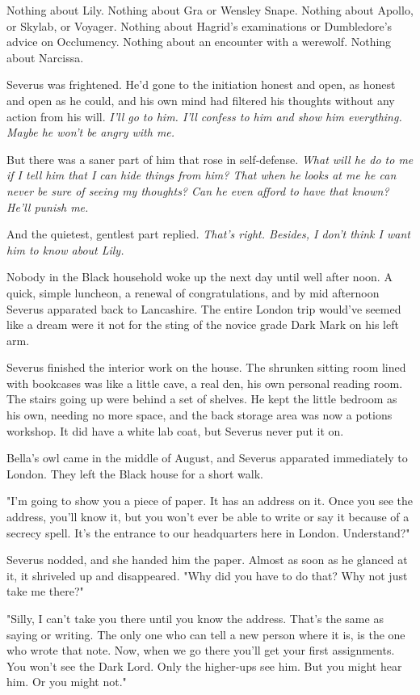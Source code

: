 \documentclass[a4paper,11pt]{article}
\begin{document}
Nothing about Lily. Nothing about Gra or Wensley Snape. Nothing about Apollo, or Skylab, or Voyager. Nothing about Hagrid's examinations or Dumbledore's advice on Occlumency. Nothing about an encounter with a werewolf. Nothing about Narcissa.

Severus was frightened. He'd gone to the initiation honest and open, as honest and open as he could, and his own mind had filtered his thoughts without any action from his will. \emph{I'll go to him. I'll confess to him and show him everything. Maybe he won't be angry with me.}

But there was a saner part of him that rose in self-defense. \emph{What will he do to me if I tell him that I can hide things from him? That when he looks at me he can never be sure of seeing my thoughts? Can he even afford to have that known? He'll punish me.}

And the quietest, gentlest part replied. \emph{That's right. Besides, I don't think I want him to know about Lily.}

Nobody in the Black household woke up the next day until well after noon. A quick, simple luncheon, a renewal of congratulations, and by mid afternoon Severus apparated back to Lancashire. The entire London trip would've seemed like a dream were it not for the sting of the novice grade Dark Mark on his left arm.

Severus finished the interior work on the house. The shrunken sitting room lined with bookcases was like a little cave, a real den, his own personal reading room. The stairs going up were behind a set of shelves. He kept the little bedroom as his own, needing no more space, and the back storage area was now a potions workshop. It did have a white lab coat, but Severus never put it on.

Bella's owl came in the middle of August, and Severus apparated immediately to London. They left the Black house for a short walk.

"I'm going to show you a piece of paper. It has an address on it. Once you see the address, you'll know it, but you won't ever be able to write or say it because of a secrecy spell. It's the entrance to our headquarters here in London. Understand?"

Severus nodded, and she handed him the paper. Almost as soon as he glanced at it, it shriveled up and disappeared. "Why did you have to do that? Why not just take me there?"

"Silly, I can't take you there until you know the address. That's the same as saying or writing. The only one who can tell a new person where it is, is the one who wrote that note. Now, when we go there you'll get your first assignments. You won't see the Dark Lord. Only the higher-ups see him. But you might hear him. Or you might not."
\end{document}
